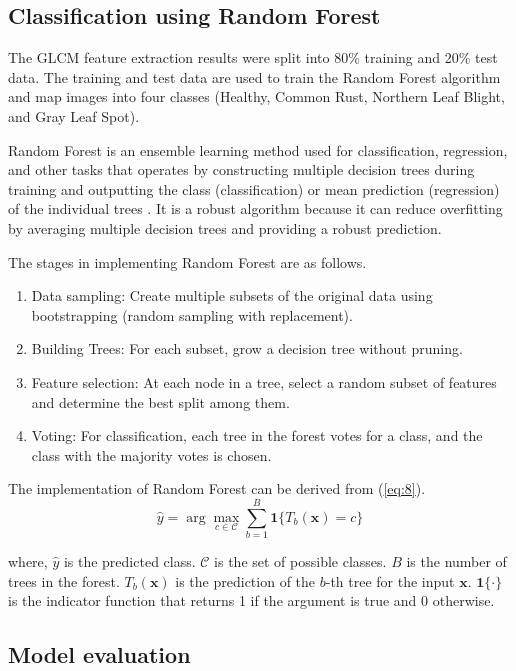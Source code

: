 \documentclass[10pt,a4paper]{article}
\begin{document}
\subsection{Classification using Random Forest}

The GLCM feature extraction results were split into 80\% training and 20\% test data. The training and test data are used to train the Random Forest algorithm and map images into four classes (Healthy, Common Rust, Northern Leaf Blight, and Gray Leaf Spot). 

Random Forest is an ensemble learning method used for classification, regression, and other tasks that operates by constructing multiple decision trees during training and outputting the class (classification) or mean prediction (regression) of the individual trees \cite{Xu2019}. It is a robust algorithm because it can reduce overfitting by averaging multiple decision trees and providing a robust prediction.

The stages in implementing Random Forest are as follows.
\begin{enumerate}
    \item Data sampling: Create multiple subsets of the original data using bootstrapping (random sampling with replacement).
    \item Building Trees: For each subset, grow a decision tree without pruning.
    \item Feature selection: At each node in a tree, select a random subset of features and determine the best split among them.
    \item Voting: For classification, each tree in the forest votes for a class, and the class with the majority votes is chosen. 
\end{enumerate}

The implementation of Random Forest can be derived from (\ref{eq:8}).
\begin{equation} \label{eq:8}
    \hat{y} = \arg\max_{c \in \mathcal{C}} \sum_{b=1}^B \mathbf{1}\{T_b(\mathbf{x}) = c\}
\end{equation}

where, \( \hat{y} \) is the predicted class. \( \mathcal{C} \) is the set of possible classes. \( B \) is the number of trees in the forest. \( T_b(\mathbf{x}) \) is the prediction of the \( b \)-th tree for the input \( \mathbf{x} \). \( \mathbf{1}\{ \cdot \} \) is the indicator function that returns 1 if the argument is true and 0 otherwise.


\subsection{Model evaluation}
\end{document}
